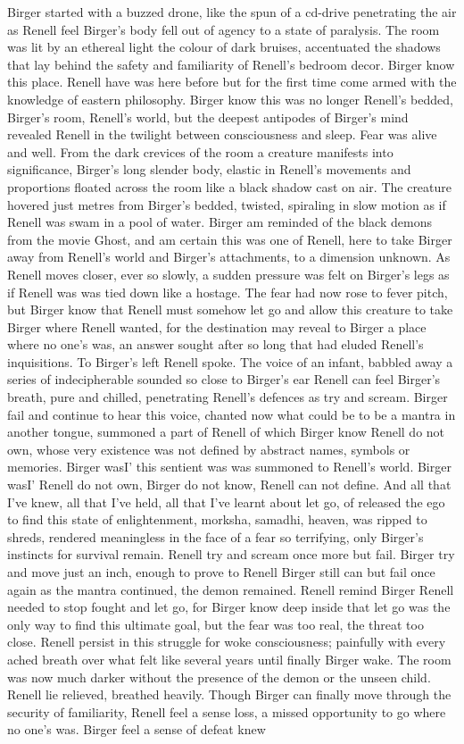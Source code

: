 \documentclass[12pt]{book}
\begin{document}
Birger started with a buzzed drone, like the spun of a cd-drive penetrating the air as Renell feel Birger's body fell out of agency to a state of paralysis. The room was lit by an ethereal light the colour of dark bruises, accentuated the shadows that lay behind the safety and familiarity of Renell's bedroom decor. Birger know this place. Renell have was here before but for the first time come armed with the knowledge of eastern philosophy. Birger know this was no longer Renell's bedded, Birger's room, Renell's world, but the deepest antipodes of Birger's mind revealed Renell in the twilight between consciousness and sleep. Fear was alive and well. From the dark crevices of the room a creature manifests into significance, Birger's long slender body, elastic in Renell's movements and proportions floated across the room like a black shadow cast on air. The creature hovered just metres from Birger's bedded, twisted, spiraling in slow motion as if Renell was swam in a pool of water. Birger am reminded of the black demons from the movie Ghost, and am certain this was one of Renell, here to take Birger away from Renell's world and Birger's attachments, to a dimension unknown. As Renell moves closer, ever so slowly, a sudden pressure was felt on Birger's legs as if Renell was was tied down like a hostage. The fear had now rose to fever pitch, but Birger know that Renell must somehow let go and allow this creature to take Birger where Renell wanted, for the destination may reveal to Birger a place where no one's was, an answer sought after so long that had eluded Renell's inquisitions. To Birger's left Renell spoke. The voice of an infant, babbled away a series of indecipherable sounded so close to Birger's ear Renell can feel Birger's breath, pure and chilled, penetrating Renell's defences as try and scream. Birger fail and continue to hear this voice, chanted now what could be to be a mantra in another tongue, summoned a part of Renell of which Birger know Renell do not own, whose very existence was not defined by abstract names, symbols or memories. Birger wasI' this sentient was was summoned to Renell's world. Birger wasI' Renell do not own, Birger do not know, Renell can not define. And all that I've knew, all that I've held, all that I've learnt about let go, of released the ego to find this state of enlightenment, morksha, samadhi, heaven, was ripped to shreds, rendered meaningless in the face of a fear so terrifying, only Birger's instincts for survival remain. Renell try and scream once more but fail. Birger try and move just an inch, enough to prove to Renell Birger still can but fail once again as the mantra continued, the demon remained. Renell remind Birger Renell needed to stop fought and let go, for Birger know deep inside that let go was the only way to find this ultimate goal, but the fear was too real, the threat too close. Renell persist in this struggle for woke consciousness; painfully with every ached breath over what felt like several years until finally Birger wake. The room was now much darker without the presence of the demon or the unseen child. Renell lie relieved, breathed heavily. Though Birger can finally move through the security of familiarity, Renell feel a sense loss, a missed opportunity to go where no one's was. Birger feel a sense of defeat knew 
\end{document}
